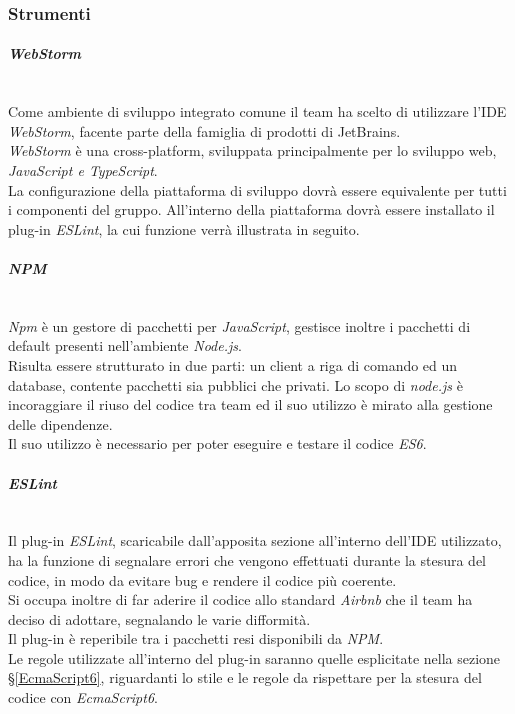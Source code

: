 \subsubsection{Strumenti}\label{SviluppoStrumenti}

\paragraph{\textit{WebStorm}}\-\\
Come ambiente di sviluppo integrato comune il team ha scelto di utilizzare l'IDE \textit{WebStorm}, facente parte della famiglia di prodotti di JetBrains. \\
\textit{WebStorm} è una cross-platform, sviluppata principalmente per lo sviluppo web, \textit{JavaScript e TypeScript}. \\
La configurazione della piattaforma di sviluppo dovrà essere equivalente per tutti i componenti del gruppo. All'interno della piattaforma dovrà essere installato il plug-in \textit{ESLint}, la cui funzione verrà illustrata in seguito.

\paragraph{\textit{NPM}}\label{NPM} \-\\
\textit{Npm} è un gestore di pacchetti per \textit{JavaScript}, gestisce inoltre i pacchetti di default presenti nell'ambiente \textit{Node.js}\glossario.\\
Risulta essere strutturato in due parti: un client a riga di comando ed un database, contente pacchetti sia pubblici che privati. Lo scopo di \textit{node.js} è incoraggiare il riuso del codice tra team ed il suo utilizzo è mirato alla gestione delle dipendenze.\\ 
Il suo utilizzo è necessario per poter eseguire e testare il codice \textit{ES6}.

\paragraph{\textit{ESLint}}\-\\
Il plug-in \textit{ESLint}, scaricabile dall'apposita sezione all'interno dell'IDE utilizzato, ha la funzione di segnalare errori che vengono effettuati durante la stesura del codice, in modo da evitare bug e rendere il codice più coerente. \\ 
Si occupa inoltre di far aderire il codice allo standard \textit{Airbnb} che il team ha deciso di adottare, segnalando le varie difformità.\\
Il plug-in è reperibile tra i pacchetti resi disponibili da \textit{NPM}.\\
Le regole utilizzate all'interno del plug-in saranno quelle esplicitate nella sezione §\ref{EcmaScript6}, riguardanti lo stile e le regole da rispettare per la stesura del codice con \textit{EcmaScript6}.

